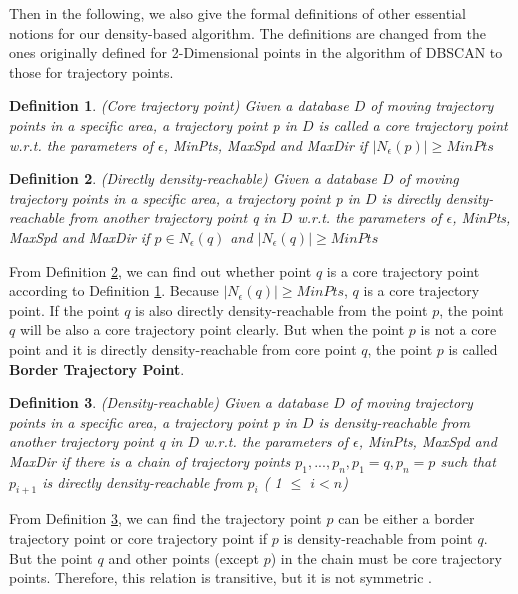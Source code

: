 \documentclass[12pt,glossary]{dalcsthesis}
\newtheorem{definition}{Definition}
\begin{document}
Then in the following, we also give the formal definitions of other essential notions for our density-based algorithm. The definitions are changed from the ones originally defined for 2-Dimensional points in the algorithm of DBSCAN \cite{DBScan96} to those for trajectory points.

\begin{definition}
\label{def:core_trajectory_point}
(Core trajectory point)
Given a database $D$ of moving trajectory points in a specific area, a trajectory point p in $D$ is called a core trajectory point w.r.t. the parameters of $\epsilon$, MinPts, MaxSpd and MaxDir if $\left|N_{\epsilon}(p)\right| \geq MinPts$
\end{definition}

\begin{definition}
\label{def:directly_density_reachable}
(Directly density-reachable)
Given a database $D$ of moving trajectory points in a specific area, a trajectory point p in $D$ is directly density-reachable from another trajectory point q in $D$ w.r.t. the parameters of $\epsilon$, MinPts, MaxSpd and MaxDir if $p \in N_{\epsilon}(q) $ and $\left|N_{\epsilon}(q)\right| \geq MinPts$ 
\end{definition}

From Definition \ref{def:directly_density_reachable}, we can find out whether point $q$ is a core trajectory point according to Definition \ref{def:core_trajectory_point}. Because $\left|N_{\epsilon}(q)\right| \geq MinPts$, $q$ is a core trajectory point. If the point $q$ is also directly density-reachable from the point $p$, the point $q$ will be also a core trajectory point clearly. But when the point $p$ is not a core point and it is directly density-reachable from core point $q$, the point $p$ is called \textbf{Border Trajectory Point}.

\begin{definition}
\label{def:density_reachable}
(Density-reachable)
Given a database $D$ of moving trajectory points in a specific area, a trajectory point p in $D$ is density-reachable from another trajectory point q in $D$ w.r.t. the parameters of $\epsilon$, MinPts, MaxSpd and MaxDir if there is a chain of trajectory points $p_1,..., p_n, p_1 = q, p_n = p$ such that $p_{i+1}$ is directly density-reachable from $p_i$  ( 1 $\leq$ $i<n$)
\end{definition}

From Definition \ref{def:density_reachable}, we can find the trajectory point $p$ can be either a border trajectory point or core trajectory point if $p$ is density-reachable from point $q$. But the point $q$ and other points (except $p$) in the chain must be core trajectory points. Therefore, this relation is transitive, but it is not symmetric \cite{DBScan96}.
\end{document}

